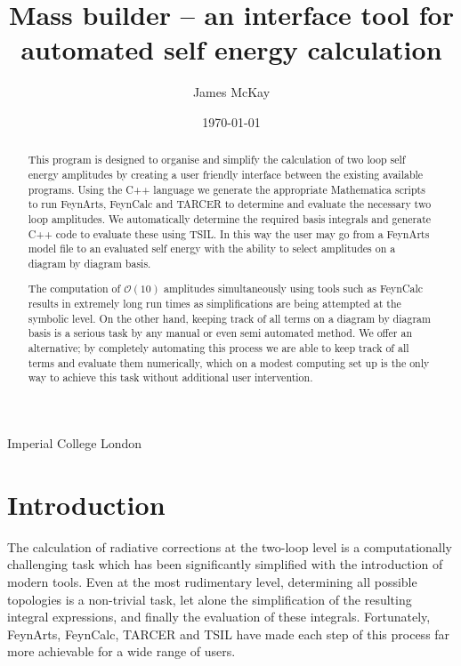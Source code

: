 



\def\A{\mathcal{A}}
\def\B{\mathcal{B}}
\def\C{\mathcal{C}}

\graphicspath{ {Figures/}}

\title{Mass builder -- an interface tool for automated self energy calculation}
%
\author
{
  James McKay
}
%
%
\institute
{
  Imperial College London\label{addr1}
}
%
\date{\today}

\maketitle

\begin{abstract}

This program is designed to organise and simplify the calculation of two loop self energy amplitudes by creating a user friendly interface between the existing available programs.  Using the C++ language we generate the appropriate Mathematica scripts to run FeynArts, FeynCalc and TARCER to determine and evaluate the necessary two loop amplitudes.  We automatically determine the required basis integrals and generate C++ code to evaluate these using TSIL.  In this way the user may go from a FeynArts model file to an evaluated self energy with the ability to select amplitudes on a diagram by diagram basis.

The computation of $\mathcal{O}(10)$ amplitudes simultaneously using tools such as FeynCalc results in extremely long run times as simplifications are being attempted at the symbolic level.  On the other hand, keeping track of all terms on a diagram by diagram basis is a serious task by any manual or even semi automated method.  We offer an alternative; by completely automating this process we are able to keep track of all terms and evaluate them numerically, which on a modest computing set up is the only way to achieve this task without additional user intervention.

\end{abstract}

\tableofcontents

\section{Introduction}

The calculation of radiative corrections at the two-loop level is a computationally challenging task which has been significantly simplified with the introduction of modern tools.  Even at the most rudimentary level, determining all possible topologies is a non-trivial task, let alone the simplification of the resulting integral expressions, and finally the evaluation of these integrals.  Fortunately, FeynArts, FeynCalc, TARCER and TSIL have made each step of this process far more achievable for a wide range of users.

